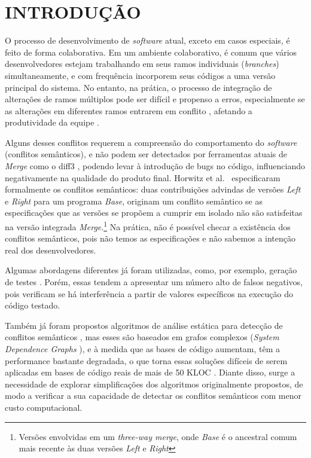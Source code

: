 \section{INTRODUÇÃO}
O processo de desenvolvimento de \emph{software} atual, exceto em casos especiais, é feito de forma colaborativa. Em um ambiente colaborativo, é comum que vários desenvolvedores estejam trabalhando em seus ramos individuais (\emph{branches}) simultaneamente, e com frequência incorporem seus códigos a uma versão principal do sistema. No entanto, na prática, o processo de integração de alterações de ramos múltiplos pode ser difícil e propenso a erros, especialmente se as alterações em diferentes ramos entrarem em conflito \cite{Bird2012AssessingTV}, afetando a produtividade da equipe \cite{6915251}.

Alguns desses conflitos requerem a compreensão do comportamento do \emph{software} (conflitos semânticos), e não podem ser detectados por ferramentas atuais de \emph{Merge} como o diff3 \cite{10.5555/1781794.1781836}, podendo levar à introdução de bugs no código, influenciando negativamente na qualidade do produto final.  Horwitz et al.~\cite{Horwitz1989IntegratingNV} especificaram formalmente os conflitos semânticos: duas contribuições advindas de versões \emph{Left} e \emph{Right} para um programa \emph{Base}, originam um conflito semântico se as especificações que as versões se propõem a cumprir em isolado não são satisfeitas na versão integrada \emph{Merge}.\footnote{Versões envolvidas em um \emph{three-way merge}, onde \emph{Base} é o ancestral comum mais recente às duas versões \emph{Left} e \emph{Right}} 
Na prática, não é possível checar a existência dos conflitos semânticos, pois não temos as especificações e não sabemos a intenção real dos desenvolvedores.

Algumas abordagens diferentes já foram utilizadas, como, por exemplo, geração de testes \cite{LeusonSilva2020}. Porém,
essas tendem a apresentar um número alto de falsos negativos, pois verificam se há interferência a partir de valores específicos na execução do código testado.

Também já foram propostos algoritmos de análise estática para detecção de conflitos semânticos  \cite{InformationFlowRoberto, Binkley95programintegration, Horwitz1989IntegratingNV}, mas esses são baseados em grafos complexos (\emph{System Dependence Graphs} \cite{Horwitz1989IntegratingNV}), e à medida que as bases de código aumentam, têm a performance bastante degradada, o que torna essas soluções difíceis de serem aplicadas em bases de código reais de mais de 50 KLOC \cite{InformationFlowRoberto}. Diante disso, surge a necessidade de explorar simplificações dos algoritmos originalmente propostos, de modo a verificar a sua capacidade de detectar os conflitos semânticos com menor custo computacional.

